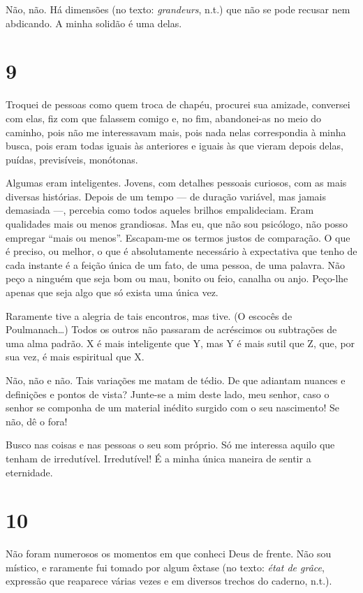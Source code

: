 Não, não. Há dimensões (no texto: \emph{grandeurs}, n.t.) que não se
pode recusar nem abdicando. A minha solidão é uma delas.

\section{9}

Troquei de pessoas como quem troca de chapéu, procurei sua amizade,
conversei com elas, fiz com que falassem comigo e, no fim, abandonei-as
no meio do caminho, pois não me interessavam mais, pois nada nelas
correspondia à minha busca, pois eram todas iguais às anteriores e
iguais às que vieram depois delas, puídas, previsíveis, monótonas.

Algumas eram inteligentes. Jovens, com detalhes pessoais curiosos, com
as mais diversas histórias. Depois de um tempo --- de duração variável,
mas jamais demasiada ---, percebia como todos aqueles brilhos
empalideciam. Eram qualidades mais ou menos grandiosas. Mas eu, que não
sou psicólogo, não posso empregar ``mais ou menos''. Escapam-me os
termos justos de comparação. O que é preciso, ou melhor, o que é
absolutamente necessário à expectativa que tenho de cada instante é a
feição única de um fato, de uma pessoa, de uma palavra. Não peço a
ninguém que seja bom ou mau, bonito ou feio, canalha ou anjo. Peço-lhe
apenas que seja algo que só exista uma única vez.

Raramente tive a alegria de tais encontros, mas tive. (O escocês de
Poulmanach\ldots{}) Todos os outros não passaram de acréscimos ou
subtrações de uma alma padrão. X é mais inteligente que Y, mas Y é mais
sutil que Z, que, por sua vez, é mais espiritual que X.

Não, não e não. Tais variações me matam de tédio. De que adiantam
nuances e definições e pontos de vista? Junte-se a mim deste lado, meu
senhor, caso o senhor se componha de um material inédito surgido com o
seu nascimento! Se não, dê o fora!

Busco nas coisas e nas pessoas o seu som próprio. Só me interessa aquilo
que tenham de irredutível. Irredutível! É a minha única maneira de
sentir a eternidade.

\section{10}

Não foram numerosos os momentos em que conheci Deus de frente. Não sou
místico, e raramente fui tomado por algum êxtase (no texto: \emph{état
de grâce}, expressão que reaparece várias vezes e em diversos trechos do
caderno, n.t.).

